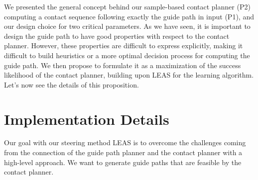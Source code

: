 \hfill

We presented the general concept behind our sample-based contact planner (P2) computing a contact sequence following exactly the guide path in input (P1), and our design choice for two critical parameters.
As we have seen, it is important to design the guide path to have good properties with respect to the contact planner. 
However, these properties are difficult to express explicitly, making it difficult to build heuristics or a more optimal decision process for computing the guide path. 
We then propose to formulate it as a maximization of the success likelihood of the contact planner, building upon LEAS for the learning algorithm. Let's now see the details of this proposition.


\section{Implementation Details\label{sub:cp-sb:leas_coupling}}

Our goal with our steering method LEAS is to overcome the challenges coming from the connection of the guide path planner and the contact planner with a high-level approach.
We want to generate guide paths that are feasible by the contact planner.

